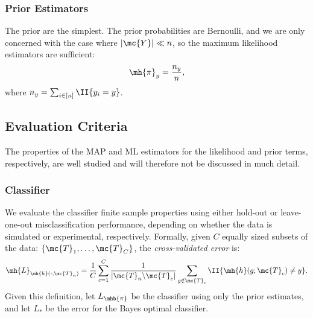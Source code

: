 \documentclass[10pt,journal,cspaper,compsoc]{IEEEtran}
\begin{document}
\subsubsection{Prior Estimators} %
\label{sub:prior_estimators}

The prior are the simplest.  The prior probabilities are Bernoulli, and we are only concerned with the case where $|\mc{Y}| \ll n$, so the maximum likelihood estimators are sufficient:
\begin{align}
\mh{\pi}_y = \frac{n_y}{n},
\end{align}
where $n_y=\sum_{i \in [n]} \II\{y_i = y\}$.



\subsection{Evaluation Criteria} %
\label{sub:evaluation_criteria}

The properties of the MAP and ML estimators for the likelihood and prior terms, respectively, are well studied \cite{Bickel2000} and will therefore not be discussed in much detail.  


\subsubsection{Classifier} %
\label{ssub:classifier}

We evaluate the classifier finite sample properties using either hold-out or leave-one-out misclassification performance, depending on whether the data is simulated or experimental, respectively.  Formally, given $C$ equally sized subsets of the data: $\{\mc{T}_{1}, \ldots, \mc{T}_{C}\}$, the \emph{cross-validated error} is:
\begin{align} \label{eq:L2}
	\mh{L}_{\mh{h}(\cdot; \mc{T}_n)} = \frac{1}{C}\sum_{c=1}^C \frac{1}{|\mc{T}_n \backslash \mc{T}_c|}\sum_{g \notin \mc{T}_c} \II\{\mh{h}(g; \mc{T}_{c}) \neq y\}.
\end{align}
Given this definition, let $L_{\mhb{\pi}}$ be the classifier using only the prior estimates, and let $L_*$ be the error for the Bayes optimal classifier.  
\end{document}

